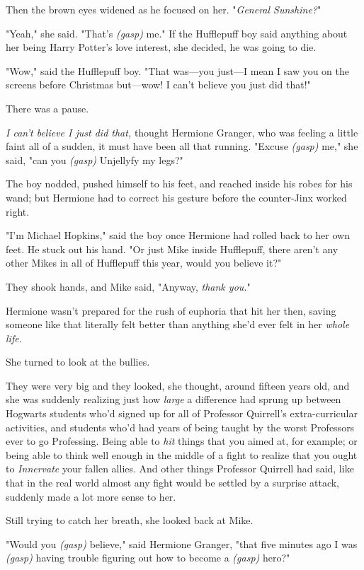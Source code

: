 Then the brown eyes widened as he focused on her. "\emph{General Sunshine?}"

"Yeah," she said. "That's \emph{(gasp)} me." If the Hufflepuff boy said 
anything about her being Harry Potter's love interest, she decided, he was 
going to die.

"Wow," said the Hufflepuff boy. "That was---you just---I mean I saw you on the 
screens before Christmas but---wow! I can't believe you just did that!"

There was a pause.

\emph{I can't believe I just did that,} thought Hermione Granger, who was 
feeling a little faint all of a sudden, it must have been all that running. 
"Excuse \emph{(gasp)} me," she said, "can you \emph{(gasp)} Unjellyfy my legs?"

The boy nodded, pushed himself to his feet, and reached inside his robes for 
his wand; but Hermione had to correct his gesture before the counter-Jinx 
worked right.

"I'm Michael Hopkins," said the boy once Hermione had rolled back to her own 
feet. He stuck out his hand. "Or just Mike inside Hufflepuff, there aren't any 
other Mikes in all of Hufflepuff this year, would you believe it?"

They shook hands, and Mike said, "Anyway, \emph{thank you.}"

Hermione wasn't prepared for the rush of euphoria that hit her then, saving 
someone like that literally felt better than anything she'd ever felt in her 
\emph{whole life.}

She turned to look at the bullies.

They were very big and they looked, she thought, around fifteen years old, and 
she was suddenly realizing just how \emph{large} a difference had sprung up 
between Hogwarts students who'd signed up for all of Professor Quirrell's 
extra-curricular activities, and students who'd had years of being taught by 
the worst Professors ever to go Professing. Being able to \emph{hit} things 
that you aimed at, for example; or being able to think well enough in the 
middle of a fight to realize that you ought to \emph{Innervate} your fallen 
allies. And other things Professor Quirrell had said, like that in the real 
world almost any fight would be settled by a surprise attack, suddenly made a 
lot more sense to her.

Still trying to catch her breath, she looked back at Mike.

"Would you \emph{(gasp)} believe," said Hermione Granger, "that five minutes 
ago I was \emph{(gasp)} having trouble figuring out how to become a 
\emph{(gasp)} hero?"

